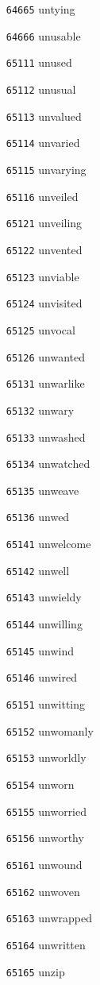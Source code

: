 \documentclass[twoside,11pt]{article}
\begin{document}
\begin{multicols}{5}
\begin{enumerate}
\item[\texttt{64665}] untying
\item[\texttt{64666}] unusable
\item[\texttt{65111}] unused
\item[\texttt{65112}] unusual
\item[\texttt{65113}] unvalued
\item[\texttt{65114}] unvaried
\item[\texttt{65115}] unvarying
\item[\texttt{65116}] unveiled
\item[\texttt{65121}] unveiling
\item[\texttt{65122}] unvented
\item[\texttt{65123}] unviable
\item[\texttt{65124}] unvisited
\item[\texttt{65125}] unvocal
\item[\texttt{65126}] unwanted
\item[\texttt{65131}] unwarlike
\item[\texttt{65132}] unwary
\item[\texttt{65133}] unwashed
\item[\texttt{65134}] unwatched
\item[\texttt{65135}] unweave
\item[\texttt{65136}] unwed
\item[\texttt{65141}] unwelcome
\item[\texttt{65142}] unwell
\item[\texttt{65143}] unwieldy
\item[\texttt{65144}] unwilling
\item[\texttt{65145}] unwind
\item[\texttt{65146}] unwired
\item[\texttt{65151}] unwitting
\item[\texttt{65152}] unwomanly
\item[\texttt{65153}] unworldly
\item[\texttt{65154}] unworn
\item[\texttt{65155}] unworried
\item[\texttt{65156}] unworthy
\item[\texttt{65161}] unwound
\item[\texttt{65162}] unwoven
\item[\texttt{65163}] unwrapped
\item[\texttt{65164}] unwritten
\item[\texttt{65165}] unzip

\end{enumerate}
\end{multicols}
\end{document}
